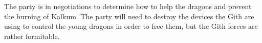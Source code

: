 The party is in negotiations to determine how to help the dragons and prevent the burning of Kalkum.
The party will need to destroy the devices the Gith are using to control the young dragons in order to free them, but the Gith forces are rather formitable.